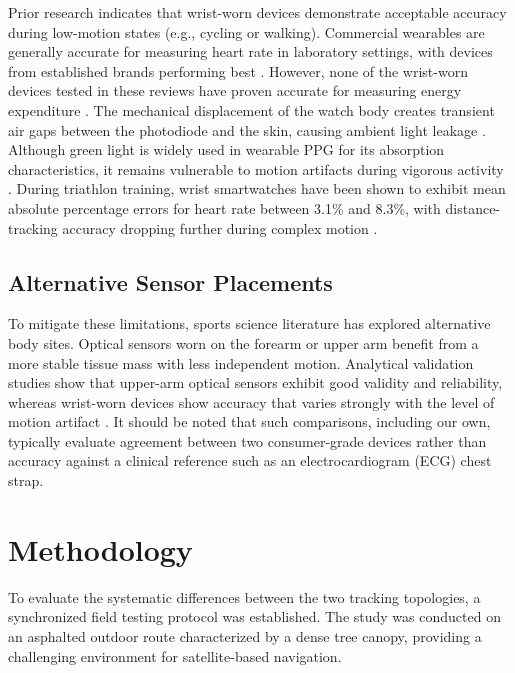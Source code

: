 \documentclass{acmsiggraph}
\begin{document}
Prior research indicates that wrist-worn devices demonstrate acceptable
accuracy during low-motion states (e.g., cycling or walking). Commercial
wearables are generally accurate for measuring heart rate in laboratory
settings, with devices from established brands performing best
\cite{fuller_reliability_2020}. However, none of the wrist-worn devices tested in
these reviews have proven accurate for measuring energy expenditure
\cite{fuller_reliability_2020,germini_accuracy_2022}. The mechanical displacement of the watch
body creates transient air gaps between the photodiode and the skin,
causing ambient light leakage \cite{kim_photoplethysmography_2023}. Although green light is
widely used in wearable PPG for its absorption characteristics, it
remains vulnerable to motion artifacts during vigorous activity
\cite{kim_photoplethysmography_2023}. During triathlon training, wrist smartwatches have been
shown to exhibit mean absolute percentage errors for heart rate between
3.1\% and 8.3\%, with distance-tracking accuracy dropping further during
complex motion \cite{jacko_validity_2024}.

\subsection{Alternative Sensor Placements}

To mitigate these limitations, sports science literature has explored
alternative body sites. Optical sensors worn on the forearm or upper arm
benefit from a more stable tissue mass with less independent motion.
Analytical validation studies show that upper-arm optical sensors exhibit
good validity and reliability, whereas wrist-worn devices show accuracy
that varies strongly with the level of motion artifact
\cite{schweizer2024heart}. It should be noted that such comparisons, including
our own, typically evaluate agreement between two consumer-grade devices
rather than accuracy against a clinical reference such as an
electrocardiogram (ECG) chest strap.

\section{Methodology}

To evaluate the systematic differences between the two tracking
topologies, a synchronized field testing protocol was established. The
study was conducted on an asphalted outdoor route characterized by a
dense tree canopy, providing a challenging environment for
satellite-based navigation.
\end{document}
